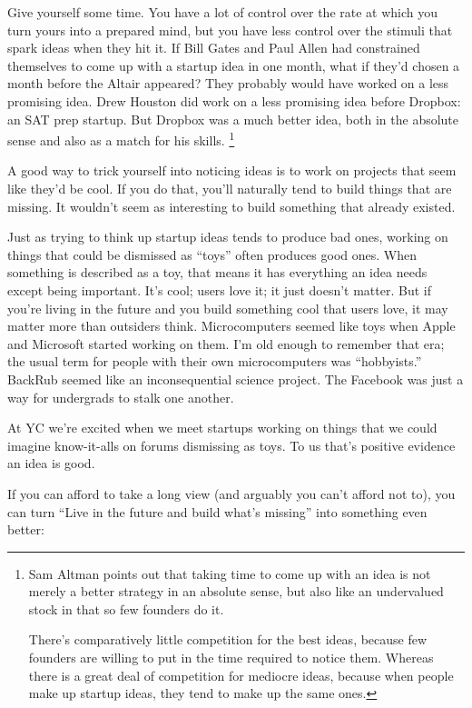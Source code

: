 Give yourself some time. You have a lot of control over the rate at
which you turn yours into a prepared mind, but you have less control
over the stimuli that spark ideas when they hit it. If Bill Gates and
Paul Allen had constrained themselves to come up with a startup idea in
one month, what if they'd chosen a month before the Altair appeared?
They probably would have worked on a less promising idea. Drew Houston
did work on a less promising idea before Dropbox: an SAT prep startup.
But Dropbox was a much better idea, both in the absolute sense and also
as a match for his skills. \footnote{Sam Altman points out that taking time to come up with an idea
is not merely a better strategy in an absolute sense, but also like an
undervalued stock in that so few founders do it.

There's comparatively little competition for the best ideas, because few
founders are willing to put in the time required to notice them. Whereas
there is a great deal of competition for mediocre ideas, because when
people make up startup ideas, they tend to make up the same ones.}

A good way to trick yourself into noticing ideas is to work on projects
that seem like they'd be cool. If you do that, you'll naturally tend to
build things that are missing. It wouldn't seem as interesting to build
something that already existed.

Just as trying to think up startup ideas tends to produce bad ones,
working on things that could be dismissed as ``toys'' often produces
good ones. When something is described as a toy, that means it has
everything an idea needs except being important. It's cool; users love
it; it just doesn't matter. But if you're living in the future and you
build something cool that users love, it may matter more than outsiders
think. Microcomputers seemed like toys when Apple and Microsoft started
working on them. I'm old enough to remember that era; the usual term for
people with their own microcomputers was ``hobbyists.'' BackRub seemed
like an inconsequential science project. The Facebook was just a way for
undergrads to stalk one another.

At YC we're excited when we meet startups working on things that we
could imagine know-it-alls on forums dismissing as toys. To us that's
positive evidence an idea is good.

If you can afford to take a long view (and arguably you can't afford not
to), you can turn ``Live in the future and build what's missing'' into
something even better:

